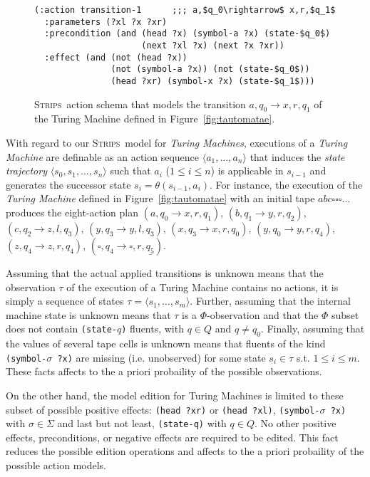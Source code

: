 \documentclass[letterpaper]{article} %
\newcommand{\tup}[1]{{\langle #1 \rangle}}
\newcommand{\strips}{\textsc{Strips}}     %
\begin{document}
\begin{figure}
\begin{scriptsize}
\begin{lstlisting}
(:action transition-1      ;;; a,$q_0\rightarrow$ x,r,$q_1$
  :parameters (?xl ?x ?xr)
  :precondition (and (head ?x) (symbol-a ?x) (state-$q_0$)
                     (next ?xl ?x) (next ?x ?xr))
  :effect (and (not (head ?x)) 
               (not (symbol-a ?x)) (not (state-$q_0$))
               (head ?xr) (symbol-x ?x) (state-$q_1$)))
\end{lstlisting}
\end{scriptsize}
 \caption{\small \strips\ action schema that models the transition $a,q_0\rightarrow x,r,q_1$ of the Turing Machine defined in Figure~\ref{fig:tautomatae}.}
\label{fig:update-rule}
\end{figure}

With regard to our \strips\ model for {\em Turing Machines}, executions of a {\em Turing Machine} are definable as an action sequence $\tup{a_1, \ldots, a_n}$ that induces the {\em state trajectory} $\tup{s_0, s_1, \ldots, s_n}$ such that $a_i$ ({\small $1\leq i\leq n$}) is applicable in $s_{i-1}$ and generates the successor state $s_i=\theta(s_{i-1},a_i)$. For instance, the execution of the {\em Turing Machine} defined in Figure~\ref{fig:tautomatae} with an initial tape $abc\square\square\square\ldots$ produces the eight-action plan {\small $(a,q_0\rightarrow x,r,q_1)$, $(b,q_1\rightarrow y,r,q_2)$, $(c,q_2\rightarrow z,l,q_3)$, $(y,q_3\rightarrow y,l,q_3)$, $(x,q_3\rightarrow x,r,q_0)$, $(y,q_0\rightarrow y,r,q_4)$, $(z,q_4\rightarrow z,r,q_4)$, $(\square,q_4\rightarrow \square,r,\underline{q_5})$}.

Assuming that the actual applied transitions is unknown means that the observation $\tau$ of the execution of a Turing Machine contains no actions, it is simply a sequence of states $\tau=\tup{s_1, \ldots , s_m}$. Further, assuming that the internal machine state is unknown means that $\tau$ is a $\Phi$-observation and that the $\Phi$ subset does not contain {\small\tt (state-$q$)} fluents, with $q\in Q$ and $q\neq q_0$. Finally, assuming that the values of several tape cells is unknown means that fluents of the kind {\small\tt (symbol-$\sigma$ ?x)} are missing (i.e. unobserved) for some state $s_i\in \tau$ s.t. $1\leq i\leq m$. These facts affects to the a priori probaility of the possible observations.

On the other hand, the model edition for Turing Machines is limited to these subset of possible positive effects: {\tt (head ?xr)} or {\tt (head ?xl)}, {\tt(symbol-$\sigma$ ?x)} with $\sigma \in \Sigma$ and last but not least, {\tt (state-q)} with $q\in Q$. No other positive effects, preconditions, or negative effects are required to be edited. This fact reduces the possible edition operations and affects to the a priori probaility of the possible action models.
\end{document}
